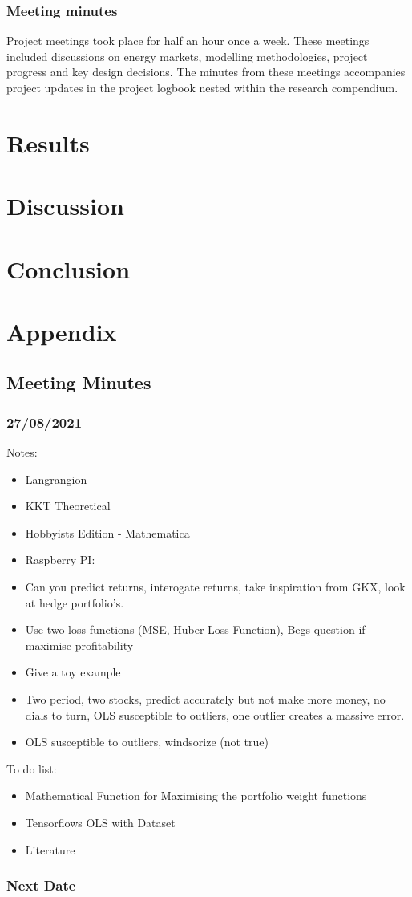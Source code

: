 \documentclass[12pt]{article}
\begin{document}
\subsubsection{Meeting minutes}
Project meetings took place for half an hour once a week. 
These meetings included discussions on energy markets, modelling methodologies, project progress and key design decisions.
The minutes from these meetings accompanies project updates in the project logbook nested within the research compendium.

\section{Results}

\section{Discussion}

\section{Conclusion}
\newpage
\section{Appendix}
\subsection{Meeting Minutes}
\subsubsection*{27/08/2021}
Notes:
\begin{itemize}
	\item Langrangion
	\item KKT Theoretical
	\item Hobbyists Edition - Mathematica
	\item Raspberry PI: 
	\item Can you predict returns, interogate returns, take inspiration from GKX, look at hedge portfolio's.
	\item Use two loss functions (MSE, Huber Loss Function), Begs question if maximise profitability
	\item Give a toy example
	\item Two period, two stocks, predict accurately but not make more money, no dials to turn, OLS susceptible to outliers, one outlier creates a massive error.
	\item OLS susceptible to outliers, windsorize (not true)
\end{itemize}
To do list:
\begin{itemize}
	\item Mathematical Function for Maximising the portfolio weight functions
	\item Tensorflows OLS with Dataset
	\item Literature
\end{itemize}
\subsubsection*{Next Date}

%
\newpage
\end{document}
